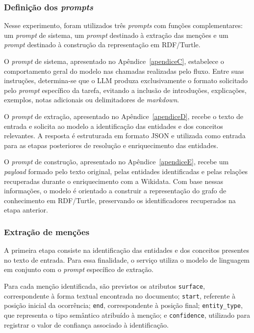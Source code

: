 \subsubsection{Definição dos \textit{prompts}}

Nesse experimento, foram utilizados três \textit{prompts} com funções complementares: um \textit{prompt} de sistema, um \textit{prompt} destinado à extração das menções e um \textit{prompt} destinado à construção da representação em RDF/Turtle.

O \textit{prompt} de sistema, apresentado no Apêndice~\ref{apendiceC}, estabelece o comportamento geral do modelo nas chamadas realizadas pelo fluxo. Entre suas instruções, determina-se que o LLM produza exclusivamente o formato solicitado pelo \textit{prompt} específico da tarefa, evitando a inclusão de introduções, explicações, exemplos, notas adicionais ou delimitadores de \textit{markdown}.

O \textit{prompt} de extração, apresentado no Apêndice~\ref{apendiceD}, recebe o texto de entrada e solicita ao modelo a identificação das entidades e dos conceitos relevantes. A resposta é estruturada em formato JSON e utilizada como entrada para as etapas posteriores de resolução e enriquecimento das entidades.

O \textit{prompt} de construção, apresentado no Apêndice~\ref{apendiceE}, recebe um \textit{payload} formado pelo texto original, pelas entidades identificadas e pelas relações recuperadas durante o enriquecimento com a Wikidata. Com base nessas informações, o modelo é orientado a construir a representação do grafo de conhecimento em RDF/Turtle, preservando os identificadores recuperados na etapa anterior.


\subsubsection{Extração de menções}

A primeira etapa consiste na identificação das entidades e dos conceitos presentes no texto de entrada. Para essa finalidade, o serviço utiliza o modelo de linguagem em conjunto com o \textit{prompt} específico de extração.

Para cada menção identificada, são previstos os atributos \texttt{surface}, correspondente à forma textual encontrada no documento; \texttt{start}, referente à posição inicial da ocorrência; \texttt{end}, correspondente à posição final; \texttt{entity\_type}, que representa o tipo semântico atribuído à menção; e \texttt{confidence}, utilizado para registrar o valor de confiança associado à identificação.

